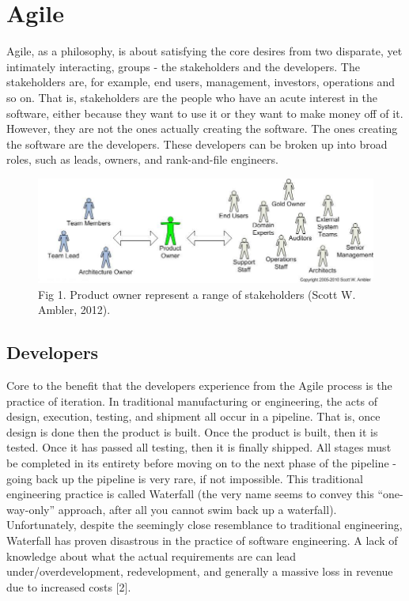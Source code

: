 \documentclass{report}
\begin{document}
\section{Agile}
Agile, as a philosophy, is about satisfying the core desires from two disparate, yet intimately interacting, groups - the stakeholders and the developers. The stakeholders are, for example, end users, management, investors, operations and so on. That is, stakeholders are the people who have an acute interest in the software, either because they want to use it or they want to make money off of it. However, they are not the ones actually creating the software. The ones creating the software are the developers. These developers can be broken up into broad roles, such as leads, owners, and rank-and-file engineers.

\begin{figure}
  \includegraphics[width=\linewidth]{productOwner.jpg}
  \caption{Fig 1. Product owner represent a range of stakeholders (Scott W. Ambler, 2012).}
\end{figure}

\subsection{Developers}
Core to the benefit that the developers experience from the Agile process is the practice of iteration. In traditional manufacturing or engineering, the acts of design, execution, testing, and shipment all occur in a pipeline. That is, once design is done then the product is built. Once the product is built, then it is tested. Once it has passed all testing, then it is finally shipped. All stages must be completed in its entirety before moving on to the next phase of the pipeline - going back up the pipeline is very rare, if not impossible. This traditional engineering practice is called Waterfall (the very name seems to convey this “one-way-only” approach, after all you cannot swim back up a waterfall). Unfortunately, despite the seemingly close resemblance to traditional engineering, Waterfall has proven disastrous in the practice of software engineering. A lack of knowledge about what the actual requirements are can lead under/overdevelopment, redevelopment, and generally a massive loss in revenue due to increased costs [2].
\end{document}
